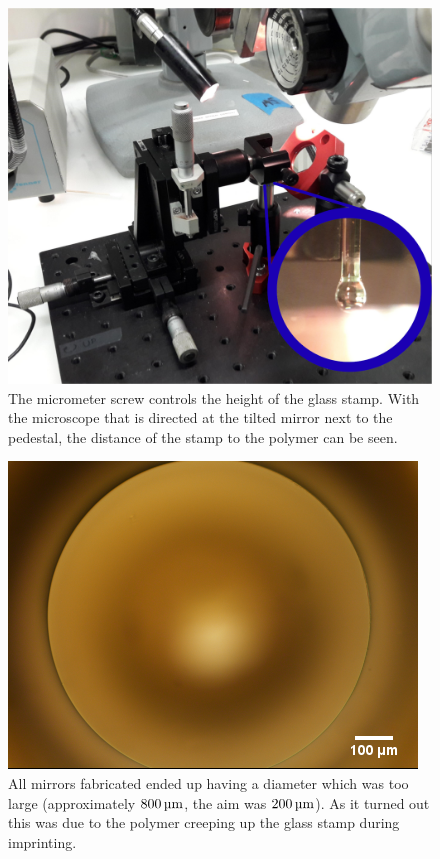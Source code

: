\begin{figure}[H]
	\includegraphics[scale=0.6]{source/tip_station}
	\caption{The micrometer screw controls the height of the glass stamp. With the microscope that is directed at the tilted mirror next to the pedestal, the distance of the stamp to the polymer can be seen.}
	\label{fig:TipStation}
\end{figure}

\begin{figure}[H]
	\includegraphics[scale=0.6]{source/mirror_too_large}
	\caption{All mirrors fabricated ended up having a diameter which was too large (approximately $800\um$, the aim was $200\um$). As it turned out this was due to the polymer creeping up the glass stamp during imprinting.}
\end{figure}

